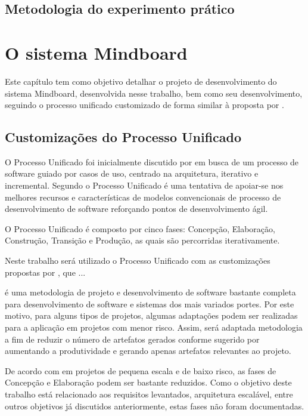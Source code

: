 \section{Metodologia do experimento prático}

\chapter{O sistema Mindboard}
\label{cap:mindboard}

Este capítulo tem como objetivo detalhar o projeto de desenvolvimento do sistema Mindboard, desenvolvida nesse trabalho, bem como seu desenvolvimento, seguindo o processo unificado customizado de forma similar à proposta por .

\section{Customizações do Processo Unificado}

O Processo Unificado foi inicialmente discutido por  em busca de um processo de software guiado por casos de uso, centrado na arquitetura, iterativo e incremental. Segundo  o Processo Unificado é uma tentativa de apoiar-se nos melhores recursos e características de modelos convencionais de processo de desenvolvimento de software reforçando pontos de desenvolvimento ágil.

O Processo Unificado é composto por cinco fases: Concepção, Elaboração, Construção, Transição e Produção, as quais são percorridas iterativamente.

Neste trabalho será utilizado o Processo Unificado com as customizações propostas por , que ...

é uma metodologia de projeto e desenvolvimento de software bastante completa para desenvolvimento de software e sistemas dos mais variados portes. Por este motivo, para alguns tipos de projetos, algumas adaptações podem ser realizadas para a aplicação em projetos com menor risco. Assim, será adaptada metodologia a fim de reduzir o número de artefatos gerados conforme sugerido por \citeauthor{joao_pu} aumentando a produtividade e gerando apenas artefatos relevantes ao projeto.

De acordo com  em projetos de pequena escala e de baixo risco, as fases de Concepção e Elaboração podem ser bastante reduzidos. Como o objetivo deste trabalho está relacionado aos requisitos levantados, arquitetura escalável, entre outros objetivos já discutidos anteriormente, estas fases não foram documentadas. 

